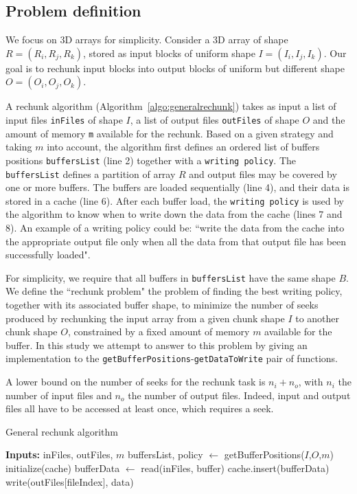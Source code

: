 \documentclass[conference]{IEEEtran}
\begin{document}
\subsection{Problem definition}
We focus on 3D arrays for simplicity. Consider a 3D array of shape $R =
(R_i, R_j, R_k)$, stored as input blocks of uniform shape $I =
(I_i, I_j, I_k)$. Our goal is to rechunk input blocks into output blocks of
uniform but different shape $O = (O_i, O_j, O_k)$.

A rechunk algorithm (Algorithm~\ref{algo:generalrechunk}) takes as input a
list of input files \texttt{inFiles} of shape $I$, a list of output files
\texttt{outFiles} of shape $O$ and the amount of memory \texttt{m}
available for the rechunk. Based on a given strategy and taking $m$ into
account, the algorithm first defines an ordered list of buffers positions
\texttt{buffersList} (line 2) together with a \texttt{writing policy}. The
\texttt{buffersList} defines a partition of array $R$ and output files
may be covered by one or more buffers. The buffers are loaded sequentially
(line 4), and their data is stored in a cache (line 6). After each buffer load,
the \texttt{writing policy} is used by the algorithm to know when to write down
the data from the cache (lines 7 and 8). An example of a writing policy could be:
``write the data from the cache into the appropriate output file only when all
the data from that output file has been successfully loaded".

For simplicity, we require that all buffers in \texttt{buffersList} have
the same shape $B$. We define the ``rechunk problem" the problem of finding the
best writing policy, together with its associated buffer shape, to minimize the
number of seeks produced by rechunking the input array from a given chunk shape
$I$ to another chunk shape $O$, constrained by a fixed amount of memory $m$
available for the buffer. In this study we attempt to answer to this problem by
giving an implementation to the \texttt{getBufferPositions}-\texttt{getDataToWrite}
pair of functions.

A lower bound on the number of seeks for the rechunk task is
$n_i + n_o$, with $n_i$ the number of input files and $n_o$ the number of output
files. Indeed, input and output files all have to be accessed at least once,
which requires a seek.

\begin{algorithm}
  \caption{General rechunk algorithm}
  \label{algo:generalrechunk}
  \begin{algorithmic}[1]
    \STATE \textbf{Inputs:} inFiles, outFiles, $m$
    \STATE buffersList, policy $\leftarrow$ getBufferPositions($I$,$O$,$m$)
    \STATE initialize(cache)
      \STATE bufferData $\leftarrow$ read(inFiles, buffer)
      \STATE cache.insert(bufferData)
        \STATE write(outFiles[fileIndex], data)
      \ENDFOR
    \ENDFOR

  \end{algorithmic}
\end{algorithm}
\end{document}
